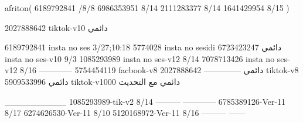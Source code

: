 afriton(
6189792841 /8/8
6986353951 8/14
2111283377 8/14
1641429954 8/15
)

2027888642 tiktok-v10
دائمي

6189792841 insta no ses
3/27;10:18
5774028 insta no sesidi
دائمي
6723423247 insta no ses-v10
9/3
1085293989 insta no ses-v12
8/14
7078713426 insta no ses-v12
8/16
------------
5754454119 facbook-v8
دائمي
--------------
2027888642 tiktok-v8
دائمي
5909533996 tiktok-v1000
دائمي مع التحديث

__________
1085293989-tik-v2
8/14
---------
------------
6785389126-Ver-11
8/17
6274626530-Ver-11
8/10
5120168972-Ver-11
8/16
---------
------
